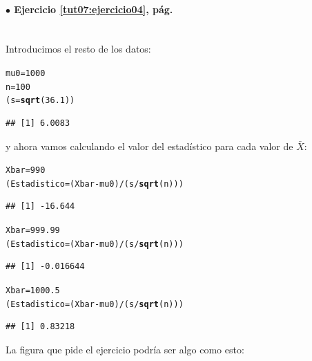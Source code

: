 \documentclass[10pt,a4paper]{article}\usepackage[]{graphicx}\usepackage[]{color}
\makeatletter
\newcommand{\hlnum}[1]{\textcolor[rgb]{0.686,0.059,0.569}{#1}}%
\newcommand{\hlopt}[1]{\textcolor[rgb]{0,0,0}{#1}}%
\newcommand{\hlstd}[1]{\textcolor[rgb]{0.345,0.345,0.345}{#1}}%
\newcommand{\hlkwb}[1]{\textcolor[rgb]{0.69,0.353,0.396}{#1}}%
\newcommand{\hlkwd}[1]{\textcolor[rgb]{0.737,0.353,0.396}{\textbf{#1}}}%
\newenvironment{kframe}{%
 \def\at@end@of@kframe{}%
 \ifinner\ifhmode%
  \def\at@end@of@kframe{\end{minipage}}%
  \begin{minipage}{\columnwidth}%
 \fi\fi%
 \def\FrameCommand##1{\hskip\@totalleftmargin \hskip-\fboxsep
 \colorbox{shadecolor}{##1}\hskip-\fboxsep
     \hskip-\linewidth \hskip-\@totalleftmargin \hskip\columnwidth}%
 \MakeFramed {\advance\hsize-\width
   \@totalleftmargin\z@ \linewidth\hsize
   \@setminipage}}%
 {\par\unskip\endMakeFramed%
 \at@end@of@kframe}
\newenvironment{knitrout}{}{} %
\makeatother
\begin{document}
\paragraph{\bf $\bullet$ Ejercicio \ref{tut07:ejercicio04}, pág. \pageref{tut07:ejercicio04}}
\label{tut07:ejercicio04:sol}\quad\\
Introducimos el resto de los datos:
\begin{knitrout}
\color{fgcolor}\begin{kframe}
\begin{alltt}
\hlstd{mu0} \hlkwb{=} \hlnum{1000}
\hlstd{n} \hlkwb{=} \hlnum{100}
\hlstd{(s} \hlkwb{=} \hlkwd{sqrt}\hlstd{(}\hlnum{36.1}\hlstd{))}
\end{alltt}
\begin{verbatim}
## [1] 6.0083
\end{verbatim}
\end{kframe}
\end{knitrout}
y ahora vamos calculando el valor del estadístico para cada valor de $\bar X$:
\begin{knitrout}
\color{fgcolor}\begin{kframe}
\begin{alltt}
\hlstd{Xbar} \hlkwb{=} \hlnum{990}
\hlstd{(Estadistico} \hlkwb{=} \hlstd{(Xbar} \hlopt{-} \hlstd{mu0)} \hlopt{/} \hlstd{(s} \hlopt{/} \hlkwd{sqrt}\hlstd{(n)))}
\end{alltt}
\begin{verbatim}
## [1] -16.644
\end{verbatim}
\begin{alltt}
\hlstd{Xbar} \hlkwb{=} \hlnum{999.99}
\hlstd{(Estadistico} \hlkwb{=} \hlstd{(Xbar} \hlopt{-} \hlstd{mu0)} \hlopt{/} \hlstd{(s} \hlopt{/} \hlkwd{sqrt}\hlstd{(n)))}
\end{alltt}
\begin{verbatim}
## [1] -0.016644
\end{verbatim}
\begin{alltt}
\hlstd{Xbar} \hlkwb{=} \hlnum{1000.5}
\hlstd{(Estadistico} \hlkwb{=} \hlstd{(Xbar} \hlopt{-} \hlstd{mu0)} \hlopt{/} \hlstd{(s} \hlopt{/} \hlkwd{sqrt}\hlstd{(n)))}
\end{alltt}
\begin{verbatim}
## [1] 0.83218
\end{verbatim}
\end{kframe}
\end{knitrout}
La figura que pide el ejercicio podría ser algo como esto:
\end{document}
